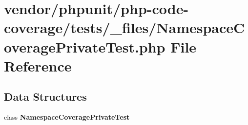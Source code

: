 \section{vendor/phpunit/php-\/code-\/coverage/tests/\+\_\+files/\+Namespace\+Coverage\+Private\+Test.php File Reference}
\label{php-code-coverage_2tests_2__files_2_namespace_coverage_private_test_8php}
\subsection*{Data Structures}
\begin{DoxyCompactItemize}
\item 
class {\bf Namespace\+Coverage\+Private\+Test}
\end{DoxyCompactItemize}
